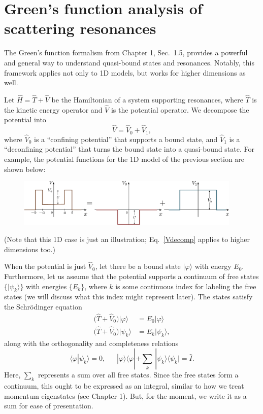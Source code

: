 \documentclass[pra,12pt]{revtex4-2}
\begin{document}
\section{Green's function analysis of scattering resonances}
\label{sec:green_resonances}

The Green's function formalism from Chapter 1, Sec.~1.5, provides a
powerful and general way to understand quasi-bound states and
resonances.  Notably, this framework applies not only to 1D models,
but works for higher dimensions as well.

Let $\hat{H} = \hat{T} + \hat{V}$ be the Hamiltonian of a system
supporting resonances, where $\hat{T}$ is the kinetic energy operator
and $\hat{V}$ is the potential operator.  We decompose the potential
into
\begin{equation}
  \hat{V} = \hat{V}_0 + \hat{V}_1,
  \label{Vdecomp}
\end{equation}
where $\hat{V}_0$ is a ``confining potential'' that supports a bound
state, and $\hat{V}_1$ is a ``deconfining potential'' that turns the
bound state into a quasi-bound state.  For example, the potential
functions for the 1D model of the previous section are shown below:

\begin{figure}[h]
  \centering\includegraphics[width=0.95\textwidth]{resonancewell_decomp}
\end{figure}

\noindent
(Note that this 1D case is just an illustration; Eq.~\eqref{Vdecomp}
applies to higher dimensions too.)

When the potential is just $\hat{V}_0$, let there be a bound state
$|\varphi\rangle$ with energy $E_0$.  Furthermore, let us assume that
the potential supports a continuum of free states $\{|\psi_k\rangle\}$
with energies $\{E_k\}$, where $k$ is some continuous index for
labeling the free states (we will discuss what this index might
represent later).  The states satisfy the Schr\"odinger equation
\begin{align}
  \big(\hat{T} + \hat{V}_0\big) |\varphi\rangle \; &= E_0 |\varphi\rangle \\ \big(\hat{T} + \hat{V}_0\big) |\psi_k\rangle &= E_k |\psi_k\rangle,
\end{align}
along with the orthogonality and completeness relations
\begin{equation}
  \langle\varphi|\psi_k\rangle = 0, \;\;\quad |\varphi\rangle\langle\varphi|
  + \sum_k \, |\psi_k\rangle\langle\psi_k| = \hat{I}.
\end{equation}
Here, $\sum_k$ represents a sum over all free states.  Since the free
states form a continuum, this ought to be expressed as an integral,
similar to how we treat momentum eigenstates (see Chapter 1).  But,
for the moment, we write it as a sum for ease of presentation.
\end{document}
